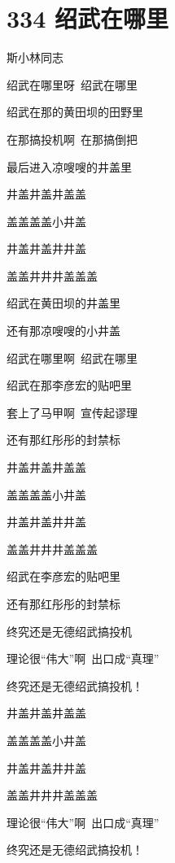 \documentclass[UTF8,12pt,oneside]{ctexbook}
\def\pau#1{\begin{center} {#1} \end{center}} %
\def\poem#1#2{\section{#1}\pau{#2}} %
\begin{document}
        \poem{334 绍武在哪里}{斯小林同志}
        \begin{center}
            绍武在哪里呀\ 绍武在哪里

            绍武在那的黄田坝的田野里
            
            在那搞投机啊\ 在那搞倒把
            
            最后进入凉嗖嗖的井盖里
            
            井盖井盖井盖盖~
            
            盖盖盖盖小井盖~
            
            井盖井盖井井盖~
            
            盖盖井井井盖盖盖~
            
            绍武在黄田坝的井盖里
            
            还有那凉嗖嗖的小井盖
            
            绍武在哪里啊\ 绍武在哪里
            
            绍武在那李彦宏的贴吧里
            
            套上了马甲啊\ 宣传起谬理
            
            还有那红彤彤的封禁标
            
            井盖井盖井盖盖~
            
            盖盖盖盖小井盖~
            
            井盖井盖井井盖~
            
            盖盖井井井盖盖盖~
            
            绍武在李彦宏的贴吧里
            
            还有那红彤彤的封禁标
            
            终究还是无德绍武搞投机
            
            理论很“伟大”啊\ 出口成“真理”
            
            终究还是无德绍武搞投机！
            
            井盖井盖井盖盖~
            
            盖盖盖盖小井盖~
            
            井盖井盖井井盖~
            
            盖盖井井井盖盖盖~
            
            理论很“伟大”啊\ 出口成“真理”
            
            终究还是无德绍武搞投机！
        \end{center}
\end{document}
